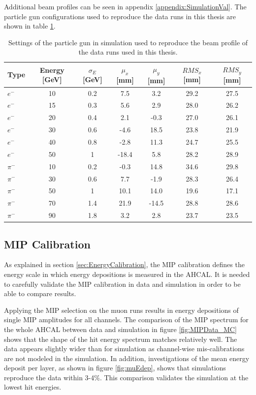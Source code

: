 Additional beam profiles can be seen in appendix \ref{appendix:SimulationVal}. The particle gun configurations used to reproduce the data runs in this thesis are shown in table \ref{table:ParticleGun}.

\begin{table}[htb!]
	\centering
	\caption{Settings of the particle gun in simulation used to reproduce the beam profile of the data runs used in this thesis.}
	\label{table:ParticleGun}
	\begin{tabular}{@{} lcccccc @{}}
		\toprule
		Type & Energy [GeV] & $\sigma_{E}$ [GeV] & $\mu_{x}$ [mm] & $\mu_{y}$ [mm] & $RMS_{x}$ [mm] & $RMS_{y}$ [mm] \\
		\midrule
		$e^-$ & 10 & 0.2 & 7.5 & 3.2 & 29.2 & 27.5\\
		$e^-$ & 15 & 0.3 & 5.6 & 2.9 & 28.0 & 26.2\\
		$e^-$ & 20 & 0.4 & 2.1 & -0.3 & 27.0 & 26.1\\
		$e^-$ & 30 & 0.6 & -4.6 & 18.5 & 23.8 & 21.9\\
		$e^-$ & 40 & 0.8 & -2.8 & 11.3 & 24.7 & 25.5\\
		$e^-$ & 50 & 1 & -18.4 & 5.8 & 28.2 & 28.9\\
		\midrule
		$\pi^-$ & 10 & 0.2 & -0.3 & 14.8 & 34.6 & 29.8\\
		$\pi^-$ & 30 & 0.6 & 7.7 & -1.9 & 28.3 & 26.4\\
		$\pi^-$ & 50 & 1 & 10.1 & 14.0 & 19.6 & 17.1\\
		$\pi^-$ & 70 & 1.4 & 21.9 & -14.5 & 28.8 & 28.6\\
		$\pi^-$ & 90 & 1.8 & 3.2 & 2.8 & 23.7 & 23.5\\
		\bottomrule
	\end{tabular}
\end{table}

\subsection{MIP Calibration}

As explained in section \ref{sec:EnergyCalibration}, the MIP calibration defines the energy scale in which energy depositions is measured in the AHCAL. It is needed to carefully validate the MIP calibration in data and simulation in order to be able to compare results.

Applying the MIP selection on the muon runs results in energy depositions of single MIP amplitudes for all channels. The comparison of the MIP spectrum for the whole AHCAL between data and simulation in figure \ref{fig:MIPData_MC} shows that the shape of the hit energy spectrum matches relatively well. The data appears slightly wider than for simulation as channel-wise mis-calibrations are not modeled in the simulation. In addition, investigations of the mean energy deposit per layer, as shown in figure \ref{fig:muEdep}, shows that simulations reproduce the data within 3-4\%. This comparison validates the simulation at the lowest hit energies.

